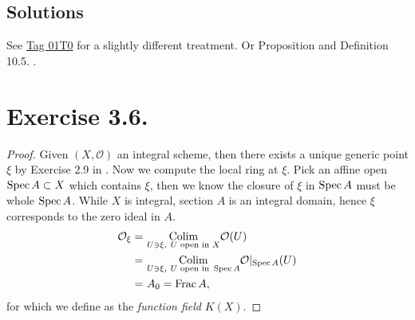 \begin{comment}
    For the first condition. Suppose $V=\Spec B$ has the property. Then we wish to check $\Spec B_g$ has the property for any $g\in B$. We know $f^{-1}(V)$ can be covered by $U_j=\Spec A_j$ where $A_j$ is f.g. $B$-algebra. Therefore 
    \[f^{-1}(\Spec B_g)=\bigcup U_j\cap f^{-1}(\Spec B_g).\]For each $U_j\cap f^{-1}(\Spec B_g)$, by the virtue of 5.3.1. Proposition of Rising Sea \cite{RaviRisingSea}, it could be covered by distinguished open subsets $D_{U_j}(a_{\bullet})$ for some $a_{\bullet}\in A_j$ (here $f^{-1}(\Spec B_g)$ is open, hence admits a covering by open affine subsets. Pick one of such open affine and intersection with open affine subset $U_j$). And all such distinguished open subsets can indeed cover $f^{-1}(\Spec B_g)$. 

    The global section of any such distinguished open is a localisation of $A_i$ at one element $a_{\bullet}$. While $A_i$ is assumed to be f.g. $B$-algebra, hence we know $\{1,a_{\bullet},...\}^{-1}A_i$ 

    I lost information about g, ???
\end{comment}

\subsection{Solutions}

See \href{https://stacks.math.columbia.edu/tag/01T0}{Tag 01T0} for a slightly different treatment. Or Proposition and Definition 10.5. \cite{gortz2020algebraic}.



\section{Exercise 3.6.}

\begin{proof}
Given $(X,\mathcal O)$ an integral scheme, then there exists a unique generic point $\xi$ by Exercise 2.9 in . Now we compute the local ring at $\xi$. Pick an affine open $\operatorname{Spec} A\subset X$ which contains $\xi$, then we know the closure of $\xi$ in $\operatorname{Spec} A$ must be whole $\operatorname{Spec} A$. While $X$ is integral, section $A$ is an integral domain, hence $\xi$ corresponds to the zero ideal in $A$.
\begin{align*}
    \mathcal O_{\xi} =&~ \underset{U \ni \xi,~ U \text{ open in } X}{\operatorname{Colim}} \mathcal O(U)\\
    =&~ \underset{U \ni \xi,~ U \text{ open in } \operatorname{Spec} A}{\operatorname{Colim}} \mathcal O\vert_{\operatorname{Spec} A}(U)\\ 
    =&~ A_{0}=\operatorname{Frac} A,
\end{align*} for which we define as the \textit{function field} $K(X)$.

\end{proof}

